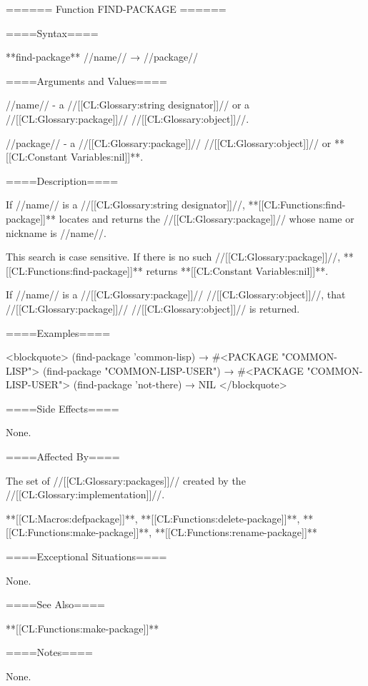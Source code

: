 ====== Function FIND-PACKAGE ======

====Syntax====

**find-package** //name// → //package//

====Arguments and Values====

//name// - a //[[CL:Glossary:string designator]]// or a //[[CL:Glossary:package]]// //[[CL:Glossary:object]]//.

//package// - a //[[CL:Glossary:package]]// //[[CL:Glossary:object]]// or **[[CL:Constant Variables:nil]]**.

====Description====

If //name// is a //[[CL:Glossary:string designator]]//, **[[CL:Functions:find-package]]** locates and returns the //[[CL:Glossary:package]]// whose name or nickname is //name//.

This search is case sensitive. If there is no such //[[CL:Glossary:package]]//, **[[CL:Functions:find-package]]** returns **[[CL:Constant Variables:nil]]**.

If //name// is a //[[CL:Glossary:package]]// //[[CL:Glossary:object]]//, that //[[CL:Glossary:package]]// //[[CL:Glossary:object]]// is returned.

====Examples====

<blockquote> (find-package 'common-lisp) → #<PACKAGE "COMMON-LISP"> (find-package "COMMON-LISP-USER") → #<PACKAGE "COMMON-LISP-USER"> (find-package 'not-there) → NIL </blockquote>

====Side Effects====

None.

====Affected By====

The set of //[[CL:Glossary:packages]]// created by the //[[CL:Glossary:implementation]]//.

**[[CL:Macros:defpackage]]**, **[[CL:Functions:delete-package]]**, **[[CL:Functions:make-package]]**, **[[CL:Functions:rename-package]]**

====Exceptional Situations====

None.

====See Also====

**[[CL:Functions:make-package]]**

====Notes====

None.

 
